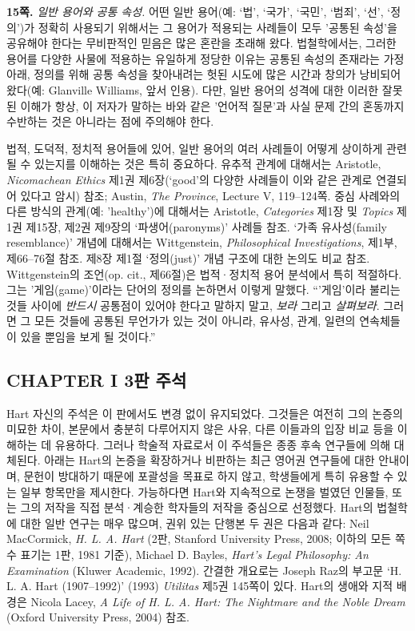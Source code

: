 \documentclass[12pt, oneside]{book}  %
\begin{document}
\textbf{15쪽.} \emph{일반 용어와 공통 속성.} 어떤 일반 용어(예: `법',
`국가', `국민', `범죄', `선', `정의')가 정확히 사용되기 위해서는 그
용어가 적용되는 사례들이 모두 '공통된 속성'을 공유해야 한다는 무비판적인
믿음은 많은 혼란을 초래해 왔다. 법철학에서는, 그러한 용어를 다양한
사물에 적용하는 유일하게 정당한 이유는 공통된 속성의 존재라는 가정 아래,
정의를 위해 공통 속성을 찾아내려는 헛된 시도에 많은 시간과 창의가
낭비되어 왔다(예: Glanville Williams, 앞서 인용). 다만, 일반 용어의
성격에 대한 이러한 잘못된 이해가 항상, 이 저자가 말하는 바와 같은
'언어적 질문'과 사실 문제 간의 혼동까지 수반하는 것은 아니라는 점에
주의해야 한다.

법적, 도덕적, 정치적 용어들에 있어, 일반 용어의 여러 사례들이 어떻게
상이하게 관련될 수 있는지를 이해하는 것은 특히 중요하다. 유추적 관계에
대해서는 Aristotle, \emph{Nicomachean Ethics} 제1권 제6장(`good'의
다양한 사례들이 이와 같은 관계로 연결되어 있다고 암시) 참조; Austin,
\emph{The Province}, Lecture V, 119--124쪽. 중심 사례와의 다른 방식의
관계(예: 'healthy')에 대해서는 Aristotle, \emph{Categories} 제1장 및
\emph{Topics} 제1권 제15장, 제2권 제9장의 `파생어(paronyms)' 사례들
참조. `가족 유사성(family resemblance)' 개념에 대해서는 Wittgenstein,
\emph{Philosophical Investigations}, 제1부, 제66--76절 참조. 제8장 제1절
`정의(just)' 개념 구조에 대한 논의도 비교 참조. Wittgenstein의 조언(op.
cit., 제66절)은 법적·정치적 용어 분석에서 특히 적절하다. 그는
'게임(game)'이라는 단어의 정의를 논하면서 이렇게 말했다. ``'게임'이라
불리는 것들 사이에 \emph{반드시} 공통점이 있어야 한다고 말하지 말고,
\emph{보라} 그리고 \emph{살펴보라}. 그러면 그 모든 것들에 공통된
무언가가 있는 것이 아니라, 유사성, 관계, 일련의 연속체들이 있을 뿐임을
보게 될 것이다.''

\subsection{\texorpdfstring{\textbf{CHAPTER I 3판
주석}}{CHAPTER I 3판 주석}}\label{chapter-i-3uxd310-uxc8fcuxc11d}

Hart 자신의 주석은 이 판에서도 변경 없이 유지되었다. 그것들은 여전히
그의 논증의 미묘한 차이, 본문에서 충분히 다루어지지 않은 사유, 다른
이들과의 입장 비교 등을 이해하는 데 유용하다. 그러나 학술적 자료로서 이
주석들은 종종 후속 연구들에 의해 대체된다. 아래는 Hart의 논증을
확장하거나 비판하는 최근 영어권 연구들에 대한 안내이며, 문헌이 방대하기
때문에 포괄성을 목표로 하지 않고, 학생들에게 특히 유용할 수 있는 일부
항목만을 제시한다. 가능하다면 Hart와 지속적으로 논쟁을 벌였던 인물들,
또는 그의 저작을 직접 분석·계승한 학자들의 저작을 중심으로 선정했다.
Hart의 법철학에 대한 일반 연구는 매우 많으며, 권위 있는 단행본 두 권은
다음과 같다: Neil MacCormick, \emph{H. L. A. Hart} (2판, Stanford
University Press, 2008; 이하의 모든 쪽수 표기는 1판, 1981 기준), Michael
D. Bayles, \emph{Hart's Legal Philosophy: An Examination} (Kluwer
Academic, 1992). 간결한 개요로는 Joseph Raz의 부고문 `H. L. A. Hart
(1907--1992)' (1993) \emph{Utilitas} 제5권 145쪽이 있다. Hart의 생애와
지적 배경은 Nicola Lacey, \emph{A Life of H. L. A. Hart: The Nightmare
and the Noble Dream} (Oxford University Press, 2004) 참조.
\end{document}
